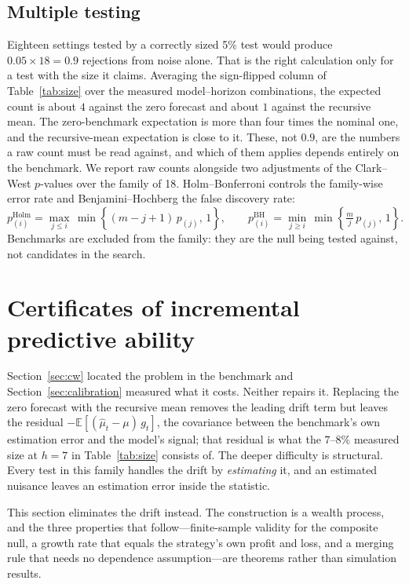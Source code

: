 \documentclass{article}
\theoremstyle{plain}
\theoremstyle{definition}
\begin{document}
\subsection{Multiple testing}

Eighteen settings tested by a correctly sized 5\% test would produce
$0.05 \times 18 = 0.9$ rejections from noise alone. That is the right calculation
only for a test with the size it claims. Averaging the sign-flipped column of
Table~\ref{tab:size} over the measured model--horizon combinations, the expected
count is about $4$ against the zero forecast and about $1$ against the recursive
mean. The zero-benchmark expectation is more than four times the nominal one, and
the recursive-mean expectation is close to it. These, not $0.9$, are the numbers a
raw count must be read against, and which of them applies depends entirely on the
benchmark. We report raw counts alongside two
adjustments of the Clark--West $p$-values over the family of 18. Holm--Bonferroni
\citep{holm1979} controls the family-wise error rate and Benjamini--Hochberg
\citep{benjamini1995} the false discovery rate:
%
\begin{equation}
  p^{\mathrm{Holm}}_{(i)} = \max_{j \le i}\, \min\!\left\{(m - j + 1)\,p_{(j)},\, 1\right\},
  \qquad
  p^{\mathrm{BH}}_{(i)} = \min_{j \ge i}\, \min\!\left\{\tfrac{m}{j}\,p_{(j)},\, 1\right\}.
\end{equation}
%
Benchmarks are excluded from the family: they are the null being tested against,
not candidates in the search.

\section{Certificates of incremental predictive ability}
\label{sec:certificate}

Section~\ref{sec:cw} located the problem in the benchmark and Section~\ref{sec:calibration}
measured what it costs. Neither repairs it. Replacing the zero forecast with the recursive
mean removes the leading drift term but leaves the residual
$-\mathbb{E}[(\hat\mu_t-\mu)\,g_t]$, the covariance between the benchmark's own estimation
error and the model's signal; that residual is what the $7$--$8\%$ measured size at $h=7$
in Table~\ref{tab:size} consists of. The deeper difficulty is structural. Every test in this
family handles the drift by \emph{estimating} it, and an estimated nuisance leaves an
estimation error inside the statistic.

This section eliminates the drift instead. The construction is a wealth process, and the
three properties that follow---finite-sample validity for the composite null, a growth rate
that equals the strategy's own profit and loss, and a merging rule that needs no dependence
assumption---are theorems rather than simulation results.
\end{document}
